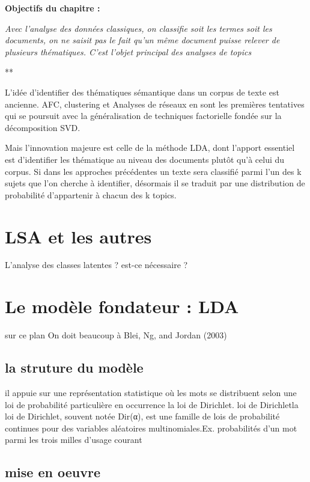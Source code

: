 \documentclass[
  letterpaper,
  DIV=11,
  numbers=noendperiod]{scrreprt}
\begin{document}
\textbf{Objectifs du chapitre :}

\emph{Avec l'analyse des données classiques, on classifie soit les
termes soit les documents, on ne saisit pas le fait qu'un même document
puisse relever de plusieurs thématiques. C'est l'objet principal des
analyses de topics}

**

L'idée d'identifier des thématiques sémantique dans un corpus de texte
est ancienne. AFC, clustering et Analyses de réseaux en sont les
premières tentatives qui se poursuit avec la généralisation de
techniques factorielle fondée sur la décomposition SVD.

Mais l'innovation majeure est celle de la méthode LDA, dont l'apport
essentiel est d'identifier les thématique au niveau des documents plutôt
qu'à celui du corpus. Si dans les approches précédentes un texte sera
classifié parmi l'un des k sujets que l'on cherche à identifier,
désormais il se traduit par une distribution de probabilité d'appartenir
à chacun des k topics.

\section{LSA et les autres}\label{lsa-et-les-autres}

L'analyse des classes latentes ? est-ce nécessaire ?

\section{Le modèle fondateur : LDA}\label{le-moduxe8le-fondateur-lda}

sur ce plan On doit beaucoup à Blei, Ng, and Jordan (2003)

\subsection{la struture du modèle}\label{la-struture-du-moduxe8le}

il appuie sur une représentation statistique où les mots se distribuent
selon une loi de probabilité particulière en occurrence la loi de
Dirichlet. loi de Dirichlet{la loi de Dirichlet, souvent notée Dir(α),
est une famille de lois de probabilité continues pour des variables
aléatoires multinomiales.Ex. probabilités d'un mot parmi les trois
milles d'usage courant}

\subsection{mise en oeuvre}\label{mise-en-oeuvre-1}
\end{document}
